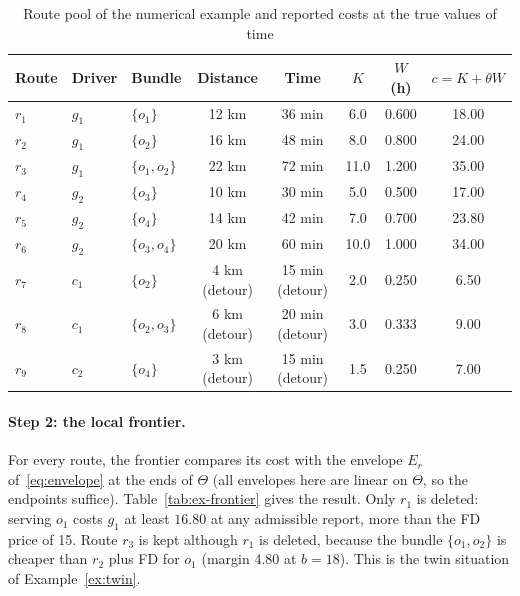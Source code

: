 \begin{table}[t]
\centering
\caption{Route pool of the numerical example and reported costs at the true values of time}
\label{tab:ex-pool}
\small
\begin{tabular}{lllccccc}
\toprule
Route & Driver & Bundle & Distance & Time & $K$ & $W$ (h) & $c=K+\theta W$\\
\midrule
$r_1$ & $g_1$ & $\{o_1\}$ & 12 km & 36 min & 6.0 & 0.600 & 18.00\\
$r_2$ & $g_1$ & $\{o_2\}$ & 16 km & 48 min & 8.0 & 0.800 & 24.00\\
$r_3$ & $g_1$ & $\{o_1,o_2\}$ & 22 km & 72 min & 11.0 & 1.200 & 35.00\\
$r_4$ & $g_2$ & $\{o_3\}$ & 10 km & 30 min & 5.0 & 0.500 & 17.00\\
$r_5$ & $g_2$ & $\{o_4\}$ & 14 km & 42 min & 7.0 & 0.700 & 23.80\\
$r_6$ & $g_2$ & $\{o_3,o_4\}$ & 20 km & 60 min & 10.0 & 1.000 & 34.00\\
$r_7$ & $c_1$ & $\{o_2\}$ & 4 km (detour) & 15 min (detour) & 2.0 & 0.250 & 6.50\\
$r_8$ & $c_1$ & $\{o_2,o_3\}$ & 6 km (detour) & 20 min (detour) & 3.0 & 0.333 & 9.00\\
$r_9$ & $c_2$ & $\{o_4\}$ & 3 km (detour) & 15 min (detour) & 1.5 & 0.250 & 7.00\\
\bottomrule
\end{tabular}
\end{table}

\paragraph{Step 2: the local frontier.} For every route, the frontier
compares its cost with the envelope $E_r$ of~\eqref{eq:envelope} at the ends of
$\Theta$ (all envelopes here are linear on $\Theta$, so the endpoints
suffice). Table~\ref{tab:ex-frontier} gives the result. Only $r_1$ is
deleted: serving $o_1$ costs $g_1$ at least $16.80$ at any admissible report,
more than the FD price of 15. Route $r_3$ is kept although $r_1$ is deleted,
because the bundle $\{o_1,o_2\}$ is cheaper than $r_2$ plus FD for $o_1$
(margin 4.80 at $b=18$). This is the twin situation of Example~\ref{ex:twin}.


